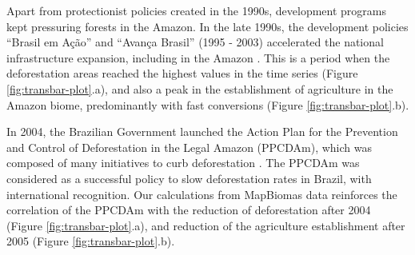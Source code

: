 \documentclass[essd, manuscript]{copernicus}
\begin{document}
Apart from protectionist policies created in the 1990s, development programs kept pressuring forests in the Amazon.
In the late 1990s, the development policies ``Brasil em Ação'' and ``Avança Brasil'' (1995 - 2003) accelerated the national infrastructure expansion, including in the Amazon \citep{Carvalho2002}.
This is a period when the deforestation areas reached the highest values in the time series (Figure \ref{fig:transbar-plot}.a), and also a peak in the establishment of agriculture in the Amazon biome, predominantly with fast conversions (Figure \ref{fig:transbar-plot}.b).

In 2004, the Brazilian Government launched the Action Plan for the Prevention and Control of Deforestation in the Legal Amazon (PPCDAm), which was composed of many initiatives to curb deforestation \citep{West2021}.
The PPCDAm was considered as a successful policy to slow deforestation rates in Brazil, with international recognition.
Our calculations from MapBiomas data reinforces the correlation of the PPCDAm with the reduction of deforestation after 2004 \citep{West2021, Arima2014} (Figure \ref{fig:transbar-plot}.a), and reduction of the agriculture establishment after 2005 (Figure \ref{fig:transbar-plot}.b).
\end{document}
